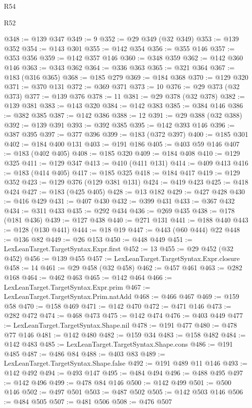\begin{lexlean}{R54}
\begin{lexlean}{R52}
\begin{coremodule}
{{{{{{{{{{{{{{{{{{{{{{{{{{{{{{{{{{{{{{{{{{{{{{{{{{{{{{{{{{{{{{{{{{{{{{{{{{{{{{{{{{{{{{{{{{{{{{{{{{{{{{{{{{{{{{{{{{{{{{{{{{{{{{{{{{{{{{{{{{{{{{{{{{{{{{{{{{{{{{{{{{{{{{{{{{{{{{{{{{{{{{{{{{{{{{{{{{{{{{@348 := @139 @347
@349 := 9
@352 := @29 @349 (@32 @349)
@353 := @139 @352
@354 := @143 @301
@355 := @142 @354
@356 := @355 @146
@357 := @353 @356
@359 := @142 @357 @146
@360 := @348 @359
@362 := @142 @360 @146
@363 := @343 @362
@364 := @336 @363
@365 := @321 @364
@367 := @183 (@316 @365)
@368 := @185 @279
@369 := @184 @368
@370 := @129 @320
@371 := @370 @131
@372 := @369 @371
@373 := 10
@376 := @29 @373 (@32 @373)
@377 := @139 @376
@378 := 11
@381 := @29 @378 (@32 @378)
@382 := @139 @381
@383 := @143 @320
@384 := @142 @383
@385 := @384 @146
@386 := @382 @385
@387 := @142 @386
@388 := 12
@391 := @29 @388 (@32 @388)
@392 := @139 @391
@393 := @392 @385
@395 := @142 @393 @146
@396 := @387 @395
@397 := @377 @396
@399 := @183 (@372 @397)
@400 := @185 @301
@402 := @184 @400 @131
@403 := @191 @186
@405 := @403 @59 @146
@407 := @183 (@402 @405)
@408 := @185 @320
@409 := @184 @408
@410 := @129 @325
@411 := @129 @347
@413 := @410 (@411 @131)
@414 := @409 @413
@416 := @183 (@414 @405)
@417 := @185 @325
@418 := @184 @417
@419 := @129 @352
@423 := @129 @376 (@129 @381 @131)
@424 := @419 @423
@425 := @418 @424
@427 := @183 (@425 @405)
@428 := @13 @182
@429 := @427 @428
@430 := @416 @429
@431 := @407 @430
@432 := @399 @431
@433 := @367 @432
@434 := @311 @433
@435 := @292 @434
@436 := @269 @435
@438 := @178 (@181 @436)
@439 := @127 @438
@440 := @271 @131
@441 := @188 @440
@443 := @128 (@130 @441)
@444 := @18 @19
@447 := @443 (@60 @444) @22
@448 := @136 @82
@449 := @26 @153
@450 := @448 @449
@451 := LexLeanTarget.TargetSyntax.Expr.first
@452 := 13
@455 := @29 @452 (@32 @452)
@456 := @139 @455
@457 := LexLeanTarget.TargetSyntax.Expr.closure
@458 := 14
@461 := @29 @458 (@32 @458)
@462 := @457 @461
@463 := @282 @168
@464 := @462 @463
@465 := @142 @464
@466 := LexLeanTarget.TargetSyntax.Expr.prim
@467 := LexLeanTarget.TargetSyntax.Prim.natAdd
@468 := @466 @467
@469 := @159 @58
@470 := @158 @469
@471 := @142 @470
@472 := @471 @146
@473 := @282 @472
@474 := @468 @473
@475 := @142 @474
@476 := @403 @449
@477 := LexLeanTarget.TargetSyntax.Shape.nil
@478 := @191 @477
@480 := @478 @77 @146
@481 := @142 @480
@482 := @159 @34
@483 := @158 @482
@484 := @142 @483
@485 := LexLeanTarget.TargetSyntax.Shape.cons
@486 := @191 @485
@487 := @486 @84
@488 := @403 @83
@489 := LexLeanTarget.TargetSyntax.Shape.false
@492 := @191 @489 @11 @146
@493 := @142 @492
@494 := @493 @147
@495 := @484 @494
@496 := @488 @495
@497 := @142 @496
@499 := @478 @84 @146
@500 := @142 @499
@501 := @500 @146
@502 := @497 @501
@503 := @487 @502
@505 := @142 @503 @146
@506 := @484 @505
@507 := @481 @506
@508 := @476 @507
}}}}}}}}}}}}}}}}}}}}}}}}}}}}}}}}}}}}}}}}}}}}}}}}}}}}}}}}}}}}}}}}}}}}}}}}}}}}}}}}}}}}}}}}}}}}}}}}}}}}}}}}}}}}}}}}}}}}}}}}}}}}}}}}}}}}}}}}}}}}}}}}}}}}}}}}}}}}}}}}}}}}}}}}}}}}}}}}}}}}}}}}}}}}}}}}}}}}}}
\end{coremodule}
\end{lexlean}
\end{lexlean}
